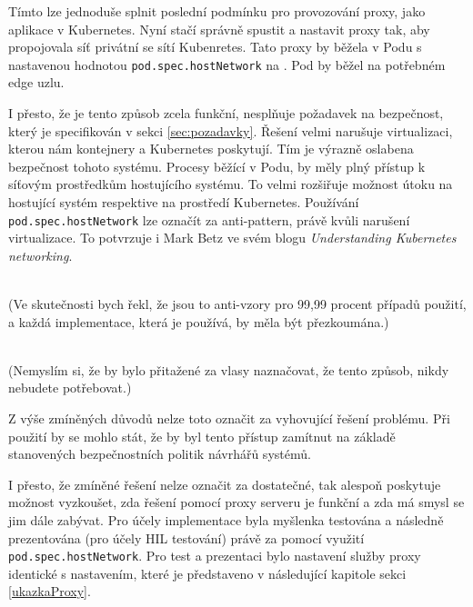 

Tímto lze jednoduše splnit poslední podmínku pro provozování proxy, jako aplikace v Kubernetes. Nyní stačí správně spustit a nastavit proxy tak, aby propojovala síť privátní se sítí Kubenretes. Tato proxy by běžela v Podu s nastavenou hodnotou \verb|pod.spec.hostNetwork| na . Pod by běžel na potřebném edge uzlu.

I přesto, že je tento způsob zcela funkční, nesplňuje požadavek na bezpečnost, který je specifikován v sekci \ref{sec:pozadavky}. Řešení velmi narušuje virtualizaci, kterou nám kontejnery a Kubernetes poskytují. Tím je výrazně oslabena bezpečnost tohoto systému. Procesy běžící v Podu, by měly plný přístup k síťovým prostředkům hostujícího systému. To velmi rozšiřuje možnost útoku na hostující systém respektive na prostředí Kubernetes. Používání \verb|pod.spec.hostNetwork| lze označít za anti-pattern, právě kvůli narušení virtualizace. To potvrzuje i Mark Betz ve svém blogu \textit{Understanding Kubernetes networking}. 

\begin{displayquote}
\textit{} \cite{betz_2022_understanding}\\(Ve skutečnosti bych řekl, že jsou to anti-vzory pro 99,99 procent případů použití, a každá implementace, která je používá, by měla být přezkoumána.) 

\textit{} \cite{betz_2022_understanding}\\(Nemyslím si, že by bylo přitažené za vlasy naznačovat, že tento způsob, nikdy nebudete potřebovat.) 
\end{displayquote}


Z výše zmíněných důvodů nelze toto označit za vyhovující řešení problému. Při použití by se mohlo stát, že by byl tento přístup zamítnut na základě stanovených bezpečnostních politik návrhářů systémů.

I přesto, že zmíněné řešení nelze označit za dostatečné, tak alespoň poskytuje možnost vyzkoušet, zda řešení pomocí proxy serveru je funkční a zda má smysl se jim dále zabývat. Pro účely implementace byla myšlenka testována a následně prezentována (pro účely HIL testování) právě za pomocí využití \verb|pod.spec.hostNetwork|. Pro test a prezentaci bylo nastavení služby proxy identické s nastavením, které je představeno v následující kapitole sekci \ref{ukazkaProxy}.

